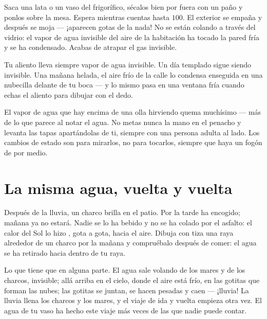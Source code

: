 \begin{example}\label{ex:g2:ice-water-steam:catch}
Saca una lata o un vaso del frigorífico, sécalos bien por fuera con un
paño y ponlos sobre la mesa. Espera mientras cuentas hasta $100$. El
exterior se empaña y después se moja --- ¡aparecen gotas de la nada!
No se están colando a través del vidrio: el vapor de agua invisible
del aire de la habitación ha tocado la pared fría y se ha condensado.
Acabas de atrapar el gas invisible.
\end{example}

\begin{example}\label{ex:g2:ice-water-steam:breath}
Tu aliento lleva siempre vapor de agua invisible. Un día templado
sigue siendo invisible. Una mañana helada, el aire frío de la calle lo
condensa enseguida en una nubecilla delante de tu boca --- y lo
mismo pasa en una ventana fría cuando echas el aliento para dibujar
con el dedo.
\end{example}

\begin{remark}\label{rem:g2:ice-water-steam:safety}
El vapor de agua que hay encima de una olla hirviendo quema muchísimo
--- más de lo que parece al notar el agua. No metas nunca la mano en
el penacho y levanta las tapas apartándolas de ti, siempre con una
persona adulta al lado. Los cambios de estado son para mirarlos, no
para tocarlos, siempre que haya un fogón de por medio.
\end{remark}

\section{La misma agua, vuelta y vuelta}

\begin{example}\label{ex:g2:ice-water-steam:puddle}
Después de la lluvia, un charco brilla en el patio. Por la tarde ha
encogido; mañana ya no estará. Nadie se lo ha bebido y no se ha
colado por el asfalto: el calor del Sol lo hizo , gota a
gota, hacia el aire. Dibuja con tiza una raya alrededor de un charco
por la mañana y compruébalo después de comer: el agua se ha retirado
hacia dentro de tu raya.
\end{example}

\begin{example}\label{ex:g2:ice-water-steam:cycle}
Lo que  tiene que  en alguna parte. El agua
sale volando de los mares y de los charcos, invisible; allá arriba en
el cielo, donde el aire está frío,  en las gotitas que
forman las nubes; las gotitas se juntan, se hacen pesadas y caen ---
¡lluvia! La lluvia llena los charcos y los mares, y el viaje de ida y
vuelta empieza otra vez. El agua de tu vaso ha hecho este viaje más
veces de las que nadie puede contar.
\end{example}

